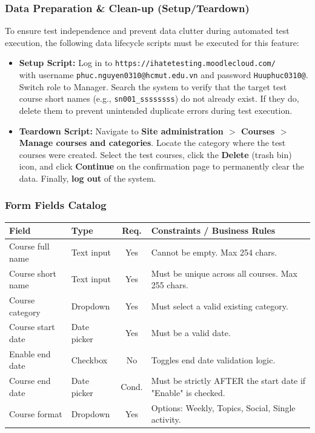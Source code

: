 \documentclass[twoside,final]{hcmut-report}
\begin{document}
\subsubsection{Data Preparation \& Clean-up (Setup/Teardown)}
To ensure test independence and prevent data clutter during automated test execution, the following data lifecycle scripts must be executed for this feature:
\begin{itemize}
    \item \textbf{Setup Script:} Log in to \texttt{https://ihatetesting.moodlecloud.com/}\\ with username \texttt{phuc.nguyen0310@hcmut.edu.vn} and password \texttt{Huuphuc0310@}. Switch role to Manager. Search the system to verify that the target test course short names (e.g., \texttt{sn001\_ssssssss}) do not already exist. If they do, delete them to prevent unintended duplicate errors during test execution.
    \item \textbf{Teardown Script:} Navigate to \textbf{Site administration $>$ Courses $>$ Manage courses and categories}. Locate the category where the test courses were created. Select the test courses, click the \textbf{Delete} (trash bin) icon, and click \textbf{Continue} on the confirmation page to permanently clear the data. Finally, \textbf{log out} of the system.
\end{itemize}

\subsubsection{Form Fields Catalog}
\begin{table}[H]
\centering
\renewcommand{\arraystretch}{1.3}
\begin{tabularx}{\textwidth}{|l|l|c|X|}
\hline
\textbf{Field} & \textbf{Type} & \textbf{Req.} & \textbf{Constraints / Business Rules} \\ \hline
Course full name & Text input & Yes & Cannot be empty. Max 254 chars. \\ \hline
Course short name & Text input & Yes & Must be unique across all courses. Max 255 chars. \\ \hline
Course category & Dropdown & Yes & Must select a valid existing category. \\ \hline
Course start date & Date picker & Yes & Must be a valid date. \\ \hline
Enable end date & Checkbox & No & Toggles end date validation logic. \\ \hline
Course end date & Date picker & Cond. & Must be strictly AFTER the start date if "Enable" is checked. \\ \hline
Course format & Dropdown & Yes & Options: Weekly, Topics, Social, Single activity. \\ \hline
\end{tabularx}
\end{table}
\end{document}
